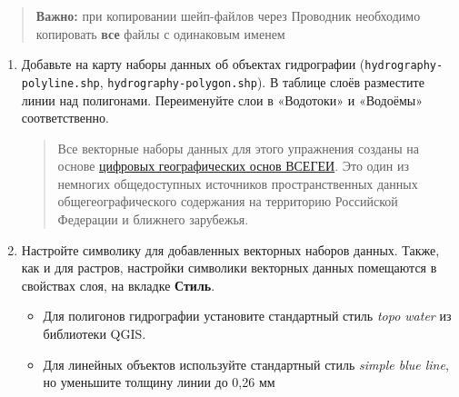 \documentclass[
  12pt,
]{book}
\providecommand{\tightlist}{%
  \setlength{\itemsep}{0pt}\setlength{\parskip}{0pt}}
\begin{document}
\begin{quote}
\textbf{Важно:} при копировании шейп-файлов через Проводник необходимо копировать \textbf{все} файлы с одинаковым именем
\end{quote}

\begin{enumerate}
\def\labelenumi{\arabic{enumi}.}
\item
  Добавьте на карту наборы данных об объектах гидрографии (\texttt{hydrography-polyline.shp}, \texttt{hydrography-polygon.shp}). В таблице слоёв разместите линии над полигонами. Переименуйте слои в «Водотоки» и «Водоёмы» соответственно.

  \begin{quote}
  Все векторные наборы данных для этого упражнения созданы на основе \href{https://www.vsegei.ru/ru/info/topo/}{цифровых географических основ ВСЕГЕИ}. Это один из немногих общедоступных источников пространственных данных общегеографического содержания на территорию Российской Федерации и ближнего зарубежья.
  \end{quote}
\item
  Настройте символику для добавленных векторных наборов данных. Также, как и для растров, настройки символики векторных данных помещаются в свойствах слоя, на вкладке \textbf{Стиль}.

  \begin{itemize}
  \tightlist
  \item
    Для полигонов гидрографии установите стандартный стиль \emph{topo water} из библиотеки QGIS.\\
  \item
    Для линейных объектов используйте стандартный стиль \emph{simple blue line}, но уменьшите толщину линии до 0,26 мм
  \end{itemize}


\end{enumerate}
\end{document}
